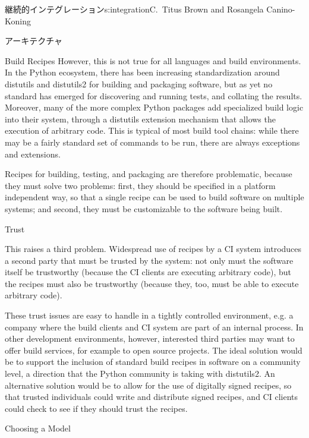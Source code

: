 \begin{aosachapter}{継続的インテグレーション}{s:integration}{C.\ Titus Brown and Rosangela Canino-Koning}
\begin{aosasect1}{アーキテクチャ}
\begin{aosasect2}{Build Recipes}
However, this is not true for all languages and build environments. In
the Python ecosystem, there has been increasing standardization around
distutils and distutils2 for building and packaging software, but as
yet no standard has emerged for discovering and running tests, and
collating the results. Moreover, many of the more complex Python
packages add specialized build logic into their system, through a
distutils extension mechanism that allows the execution of arbitrary
code. This is typical of most build tool chains: while there may be a
fairly standard set of commands to be run, there are always exceptions
and extensions.

Recipes for building, testing, and packaging are therefore
problematic, because they must solve two problems: first, they should
be specified in a platform independent way, so that a single recipe
can be used to build software on multiple systems; and second, they
must be customizable to the software being built.

\end{aosasect2}

\begin{aosasect2}{Trust}

This raises a third problem.  Widespread use of recipes by a CI system
introduces a second party that must be trusted by the system: not only
must the software itself be trustworthy (because the CI clients are
executing arbitrary code), but the recipes must also be trustworthy
(because they, too, must be able to execute arbitrary code).

These trust issues are easy to handle in a tightly controlled
environment, e.g. a company where the build clients and CI system are
part of an internal process. In other development environments,
however, interested third parties may want to offer build services,
for example to open source projects. The ideal solution would be to
support the inclusion of standard build recipes in software on a
community level, a direction that the Python community is taking with
distutils2. An alternative solution would be to allow for the use of
digitally signed recipes, so that trusted individuals could write and
distribute signed recipes, and CI clients could check to see if they
should trust the recipes.

\end{aosasect2}

\begin{aosasect2}{Choosing a Model}


\end{aosasect2}
\end{aosasect1}
\end{aosachapter}
